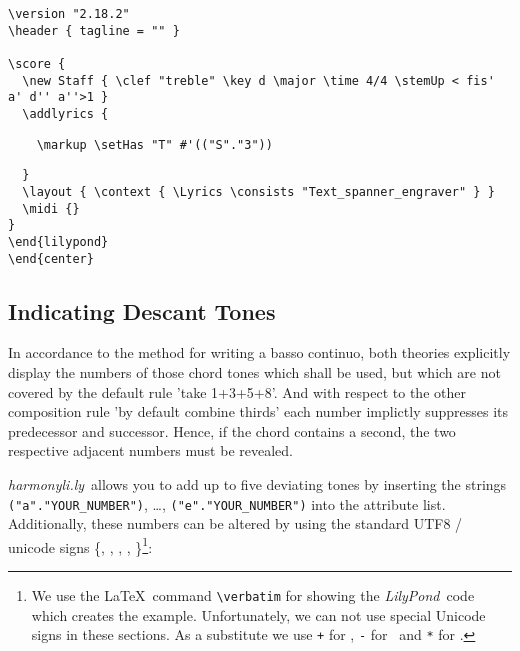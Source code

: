 \documentclass[
  DIV=calc,
  BCOR=5mm,
  12pt,
  headings=small,
  oneside,
  abstract=true,
  toc=bib,
  xcolor=dvipsnames,
  openany,
  ngerman,english]{scrartcl}
\newcommand{\hlyn}[0]{\textit{harmonyli.ly}}
\newcommand{\lily}[0]{\textit{LilyPond}}
\begin{document}
\begin{scriptsize}
\begin{verbatim}
\version "2.18.2"
\header { tagline = "" }

\score {
  \new Staff { \clef "treble" \key d \major \time 4/4 \stemUp < fis' a' d'' a''>1 }
  \addlyrics { 
\end{verbatim}
{ \color{red} \verb|    \markup \setHas "T" #'(("S"."3"))| }
\begin{verbatim}    
  }
  \layout { \context { \Lyrics \consists "Text_spanner_engraver" } }
  \midi {}
}
\end{lilypond}
\end{center}
\end{verbatim}
\end{scriptsize}

\subsection{Indicating Descant Tones}

In accordance to the method for writing a basso continuo, both theories
explicitly display the numbers of those chord tones which shall be used, but
which are not covered by the default rule 'take 1+3+5+8'. And with respect to
the other composition rule 'by default combine thirds' each number implictly
suppresses its predecessor and successor. Hence, if the chord contains a second,
the two respective adjacent numbers must be revealed.

\hlyn\ allows you to add up to five deviating tones by inserting the strings
\texttt{("a"."YOUR\_NUMBER")}, \ldots, \texttt{("e"."YOUR\_NUMBER")} into the
attribute list. Additionally, these numbers can be altered by using the standard
UTF8 / unicode signs \{\musDoubleFlat , \musFlat , \musNatural , \musSharp ,
\musDoubleSharp \}\footnote{We use the \LaTeX\ command
 \texttt{\textbackslash verbatim} for showing the \lily\ code which creates the
 example. Unfortunately, we can not use special Unicode signs in these sections.
As a substitute we use \texttt{+} for \musSharp, \texttt{-} for \musFlat\ and 
 \texttt{*} for \musNatural. }:

\begin{center}
\end{center}
\end{document}
